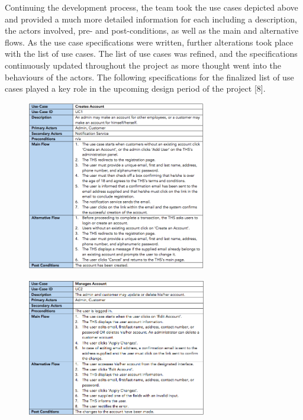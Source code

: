 \documentclass[fontsize=11pt]{extarticle}
\numberwithin{figure}{section} %
\numberwithin{table}{section}%
\begin{document}
Continuing the development process, the team took the use cases depicted
above and provided a much more detailed information for each including a
description, the actors involved, pre- and post-conditions, as well as
the main and alternative flows. As the use case specifications were
written, further alterations took place with the list of use cases. The
list of use cases was refined, and the specifications continuously
updated throughout the project as more thought went into the behaviours
of the actors. The following specifications for the finalized list of
use cases played a key role in the upcoming design period of the project
{[}8{]}.

\begin{figure}[H]
      \centering
      \includegraphics[trim = 0 0 0 0, clip, width=0.7\textwidth]{TempImg/UC1.png}
 \end{figure}

\begin{figure}[H]
      \centering
      \includegraphics[trim = 0 0 0 0, clip, width=0.7\textwidth]{TempImg/UC2.png}
 \end{figure}
\end{document}

